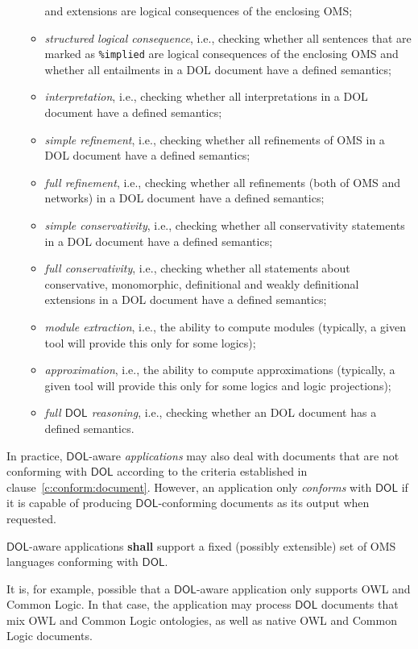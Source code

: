 \documentclass[10pt, a4paper]{isov2}
\newcommand*{\syntax}[1]{\texttt{#1}}
\newcommand*{\shall}{\textbf{shall}\xspace}
\newcommand*{\DOL}{\ensuremath{\mathsf{DOL}}\xspace}
\renewcommand{\clauserefname}{clause}
\renewcommand{\cref}[1]{\clauserefname~\ref{#1}}
\begin{document}
\begin{itemize}
\begin{itemize}
and extensions are logical consequences
of the enclosing OMS;
\item \emph{structured logical consequence}, i.e., checking whether all sentences that are marked as \syntax{\%implied} are logical consequences
  of the enclosing OMS and whether all entailments in a DOL document
  have a defined semantics;
\item \emph{interpretation}, i.e., checking whether all interpretations in a DOL document have a defined semantics;
\item \emph{simple refinement}, i.e., checking whether all
  refinements of OMS in a DOL document have a defined semantics;
\item \emph{full refinement}, i.e., checking whether all refinements
  (both of OMS and networks) in a DOL document have a defined
  semantics;
\item \emph{simple conservativity}, i.e., checking whether all conservativity
  statements in a DOL document have a defined semantics;
\item \emph{full conservativity}, i.e., checking whether all
  statements about conservative, monomorphic, definitional and weakly
  definitional extensions in a DOL document have a defined semantics;
\item \emph{module extraction}, i.e., the ability to compute modules
(typically, a given tool will provide this only for some logics);
\item \emph{approximation}, i.e., the ability to compute approximations
(typically, a given tool will provide this only for some logics
and logic projections);
\item \emph{full \DOL reasoning}, i.e., checking whether an DOL
  document has a defined semantics.
\end{itemize}
\end{itemize}


In practice, \DOL-aware \emph{applications} may also deal with documents that are not conforming
with \DOL according to the criteria established in \cref{c:conform:document}.  However, an
application only \emph{conforms} with \DOL if it is capable of producing \DOL-conforming documents as
its output when requested.


\DOL-aware applications \shall support a fixed (possibly extensible) set of OMS languages
conforming with \DOL.

  It is, for example, possible that a \DOL-aware application only supports OWL
and Common Logic.  In that case, the application may process \DOL documents that mix OWL and Common
Logic ontologies, as well as native OWL and Common Logic documents.
\end{document}
